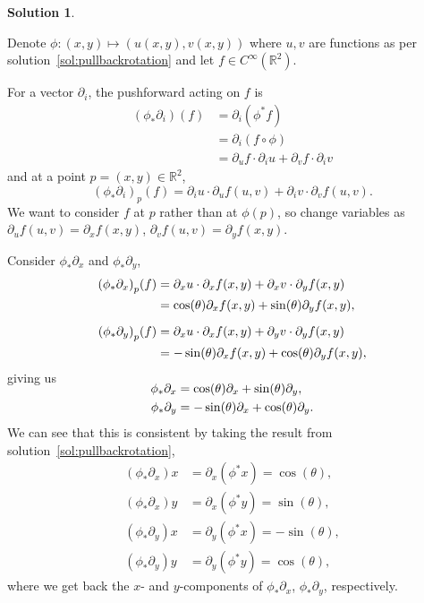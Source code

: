 \documentclass[11pt, a4paper]{article}
\theoremstyle{definition}
\newtheorem{sol}{Solution}[part]
\begin{document}
\begin{sol}\label{sol:pushforwardrotation}

Denote $\phi: (x, y) \mapsto (u(x, y), v(x, y))$ where $u, v$ are functions as per solution~\ref{sol:pullbackrotation} and let $f \in C^\infty(\mathbb{R}^2)$.

For a vector $\partial_i$, the pushforward acting on $f$ is
\begin{align*}
    (\phi_* \partial_i)(f) &= \partial_i (\phi^* f) \\
        &= \partial_i (f \circ \phi) \\
        &= \partial_u f \cdot \partial_i u + \partial_v f \cdot \partial_i v
\end{align*}
and at a point $p = (x, y) \in \mathbb{R}^2$,
\[
     {(\phi_* \partial_i)}_p(f) = \partial_i u \cdot \partial_u f(u, v) + \partial_i v \cdot \partial_v f(u, v).
\]
We want to consider $f$ at $p$ rather than at $\phi(p)$, so change variables as $\partial_u f(u, v) = \partial_x f(x, y)$, $\partial_v f(u, v) = \partial_y f(x, y)$.

Consider $\phi_* \partial_x$ and $\phi_* \partial_y$,
\begin{align*}
    {(\phi_* \partial_x)}_p(f) &= \partial_x u \cdot \partial_x f(x, y) + \partial_x v \cdot \partial_y f(x, y) \\
        &= \cos(\theta) \partial_x f(x, y) + \sin(\theta) \partial_y f(x, y), \\[2\jot]
    {(\phi_* \partial_y)}_p(f) &= \partial_x u \cdot \partial_x f(x, y) + \partial_y v \cdot \partial_y f(x, y) \\
        &= -\sin(\theta) \partial_x f(x, y) + \cos(\theta) \partial_y f(x, y),
\end{align*}
giving us
\begin{align*}
    \SwapAboveDisplaySkip
    \phi_* \partial_x &= \cos(\theta) \partial_x + \sin(\theta) \partial_y, \\
    \phi_* \partial_y &= -\sin(\theta) \partial_x + \cos(\theta) \partial_y.
\end{align*}
We can see that this is consistent by taking the result from solution~\ref{sol:pullbackrotation},
\begin{align*}
    (\phi_* \partial_x) x &= \partial_x(\phi^* x) = \cos(\theta), \\
    (\phi_* \partial_x) y &= \partial_x(\phi^* y) = \sin(\theta), \\
    (\phi_* \partial_y) x &= \partial_y(\phi^* x) = -\sin(\theta), \\
    (\phi_* \partial_y) y &= \partial_y(\phi^* y) = \cos(\theta),
\end{align*}
where we get back the $x$- and $y$-components of $\phi_* \partial_x$, $\phi_* \partial_y$, respectively.

\end{sol}
\end{document}
